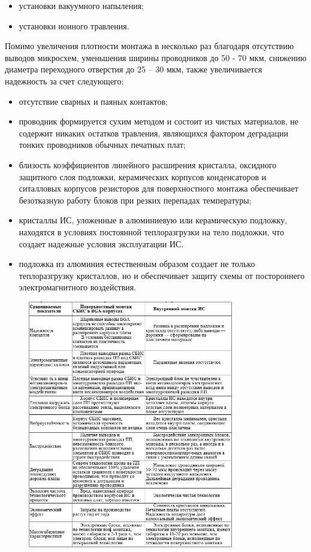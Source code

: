 \documentclass[unicode, 12pt, a4paper, oneside]{article}
\begin{document}
\begin{itemize}
\item установки вакуумного напыления;
\item установки ионного травления.
\end{itemize}

Помимо увеличения плотности монтажа в несколько раз благодаря отсутствию выводов микросхем, уменьшения ширины проводников до 50 - 70 мкм, снижению диаметра переходного отверстия до 25 – 30 мкм, также увеличивается надежность за счет следующего:

\begin{itemize}
\item отсутствие сварных и паяных контактов;
\item проводник формируется сухим методом и состоит из чистых материалов, не содержит никаких остатков травления, являющихся фактором деградации тонких проводников обычных печатных плат;
\item близость коэффициентов линейного расширения кристалла, оксидного защитного слоя подложки, керамических корпусов конденсаторов и ситалловых корпусов резисторов для поверхностного монтажа обеспечивает безотказную работу блоков при резких перепадах температуры;
\item кристаллы ИС, уложенные в алюминиевую или керамическую подложку, находятся в условиях постоянной теплоразгрузки на тело подложки, что создает надежные условия эксплуатации ИС.
\item подложка из алюминия естественным образом создает не только теплоразгрузку кристаллов, но и обеспечивает защиту схемы от постороннего электромагнитного воздействия.
\end{itemize}

\begin{figure}[htbp]
\centering
\includegraphics[width=0.8\textwidth]{100_table.png}
\end{figure}
\end{document}
